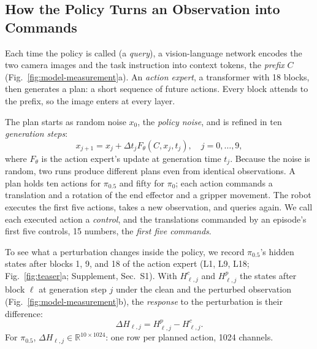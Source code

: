 \subsection{How the Policy Turns an Observation into Commands}
\label{sec:generation}
Each time the policy is called (a \emph{query}), a vision-language network encodes the two camera images and the task instruction into context tokens, the \emph{prefix} $C$ (Fig.~\ref{fig:model-measurement}a). An \emph{action expert}, a transformer with 18 blocks, then generates a plan: a short sequence of future actions. Every block attends to the prefix, so the image enters at every layer.

The plan starts as random noise $x_0$, the \emph{policy noise}, and is refined in ten \emph{generation steps}:
\begin{equation}
x_{j+1}=x_j+\Delta t_j F_\theta(C,x_j,t_j),\quad j=0,\ldots,9,
\label{eq:generation}
\end{equation}
where $F_\theta$ is the action expert's update at generation time $t_j$. Because the noise is random, two runs produce different plans even from identical observations. A plan holds ten actions for $\pi_{0.5}$ and fifty for $\pi_0$; each action commands a translation and a rotation of the end effector and a gripper movement. The robot executes the first five actions, takes a new observation, and queries again. We call each executed action a \emph{control}, and the translations commanded by an episode's first five controls, 15 numbers, the \emph{first five commands}.

To see what a perturbation changes inside the policy, we record $\pi_{0.5}$'s hidden states after blocks 1, 9, and 18 of the action expert (L1, L9, L18; Fig.~\ref{fig:teaser}a; Supplement, Sec.~S1). With $H^c_{\ell,j}$ and $H^p_{\ell,j}$ the states after block $\ell$ at generation step $j$ under the clean and the perturbed observation (Fig.~\ref{fig:model-measurement}b), the \emph{response} to the perturbation is their difference:
\begin{equation}
\Delta H_{\ell,j}=H^p_{\ell,j}-H^c_{\ell,j}.
\label{eq:response}
\end{equation}
For $\pi_{0.5}$, $\Delta H_{\ell,j}\in\mathbb R^{10\times1024}$: one row per planned action, 1024 channels.
